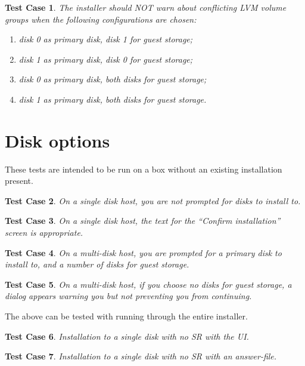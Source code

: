 \documentclass[a4paper]{article}
\newtheorem{testcase}{Test Case}
\begin{document}
\begin{testcase}
The installer should NOT warn about conflicting LVM volume groups when
the following configurations are chosen:
\begin{enumerate}
\item disk 0 as primary disk, disk 1 for guest storage;
\item disk 1 as primary disk, disk 0 for guest storage;
\item disk 0 as primary disk, both disks for guest storage;
\item disk 1 as primary disk, both disks for guest storage.
\end{enumerate}
\end{testcase}

\section{Disk options}

These tests are intended to be run on a box without an existing
installation present.

\begin{testcase}
On a single disk host, you are not prompted for disks to install to.
\end{testcase}

\begin{testcase}
On a single disk host, the text for the ``Confirm installation''
screen is appropriate.
\end{testcase}

\begin{testcase}
On a multi-disk host, you are prompted for a primary disk to install
to, and a number of disks for guest storage.
\end{testcase}

\begin{testcase}
On a multi-disk host, if you choose no disks for guest storage, a
dialog appears warning you but not preventing you from continuing.
\end{testcase}

The above can be tested with running through the entire installer.

\begin{testcase}
Installation to a single disk with no SR with the UI.
\end{testcase}

\begin{testcase}
Installation to a single disk with no SR with an answer-file.
\end{testcase}
\end{document}
